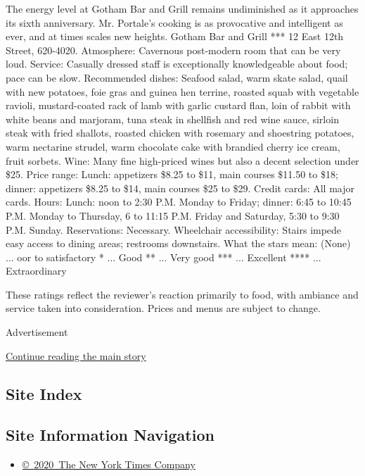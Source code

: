 The energy level at Gotham Bar and Grill remains undiminished as it
approaches its sixth anniversary. Mr. Portale's cooking is as
provocative and intelligent as ever, and at times scales new heights.
Gotham Bar and Grill *** 12 East 12th Street, 620-4020. Atmosphere:
Cavernous post-modern room that can be very loud. Service: Casually
dressed staff is exceptionally knowledgeable about food; pace can be
slow. Recommended dishes: Seafood salad, warm skate salad, quail with
new potatoes, foie gras and guinea hen terrine, roasted squab with
vegetable ravioli, mustard-coated rack of lamb with garlic custard flan,
loin of rabbit with white beans and marjoram, tuna steak in shellfish
and red wine sauce, sirloin steak with fried shallots, roasted chicken
with rosemary and shoestring potatoes, warm nectarine strudel, warm
chocolate cake with brandied cherry ice cream, fruit sorbets. Wine: Many
fine high-priced wines but also a decent selection under \$25. Price
range: Lunch: appetizers \$8.25 to \$11, main courses \$11.50 to \$18;
dinner: appetizers \$8.25 to \$14, main courses \$25 to \$29. Credit
cards: All major cards. Hours: Lunch: noon to 2:30 P.M. Monday to
Friday; dinner: 6:45 to 10:45 P.M. Monday to Thursday, 6 to 11:15 P.M.
Friday and Saturday, 5:30 to 9:30 P.M. Sunday. Reservations: Necessary.
Wheelchair accessibility: Stairs impede easy access to dining areas;
restrooms downstairs. What the stars mean: (None) ... oor to
satisfactory * ... Good ** ... Very good *** ... Excellent **** ...
Extraordinary

These ratings reflect the reviewer's reaction primarily to food, with
ambiance and service taken into consideration. Prices and menus are
subject to change.

Advertisement

\protect\hyperlink{after-bottom}{Continue reading the main story}

\hypertarget{site-index}{%
\subsection{Site Index}\label{site-index}}

\hypertarget{site-information-navigation}{%
\subsection{Site Information
Navigation}\label{site-information-navigation}}

\begin{itemize}
\tightlist
\item
  \href{https://help.nytimes3xbfgragh.onion/hc/en-us/articles/115014792127-Copyright-notice}{©~2020~The
  New York Times Company}
\end{itemize}

